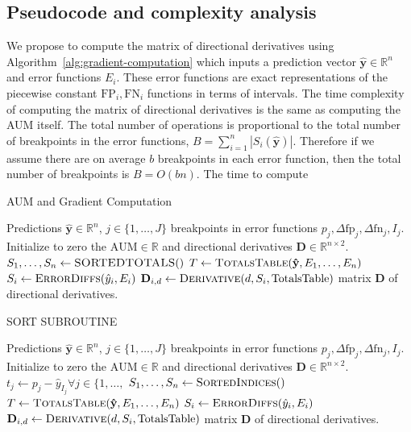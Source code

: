 \documentclass{article}
\begin{document}
\subsection{Pseudocode and complexity analysis}
We propose to compute the matrix of directional derivatives using Algorithm~\ref{alg:gradient-computation} which inputs a prediction vector $\mathbf {\hat y}\in\mathbb R^n$ and error functions $E_i$.
These error functions are exact representations of the piecewise constant $\text{FP}_i, \text{FN}_i$ functions in terms of intervals.
The time complexity of computing the matrix of directional derivatives 
is the same as computing the AUM itself.
The total number of operations is proportional to the total number of breakpoints in the error functions, $B = \sum_{i=1}^n |S_i(\mathbf{\hat{y}})|$.
Therefore if we assume there are on average $b$ breakpoints in each error function, then the total number of breakpoints is $B=O(bn)$.
The time to compute


\begin{algorithm}[tb]
  \caption{AUM and Gradient Computation}
  \label{alg:gradient-computation}
\begin{algorithmic}[1]
  Predictions $\mathbf{\hat y}\in\mathbb R^n$, 
  $j\in\{1,\dots,J\}$ breakpoints in error functions  $p_j,\Delta\text{fp}_j,\Delta\text{fn}_j,I_j$.
  \STATE Initialize to zero the $\text{AUM}\in\mathbb R$ and directional derivatives $\mathbf D\in\mathbb R^{n\times 2}$.
  \STATE  $S_1,\dots,S_n\gets \textsc{SORTEDTOTALS}()$
  \STATE  $T\gets \textsc{TotalsTable}(\mathbf{\hat y}, E_1, \dots, E_n)$
  \STATE $S_i \gets \textsc{ErrorDiffs}(\hat y_i, E_i)$
  \STATE $\mathbf D_{i,d}\gets \textsc{Derivative}(d, S_i, \text{TotalsTable})$
  \ENDFOR
  \ENDFOR
   matrix $\mathbf D$ of directional derivatives.
\end{algorithmic}
\end{algorithm}

\begin{algorithm}[tb]
  \caption{SORT SUBROUTINE}
  \label{alg:sort-subroutine}
\begin{algorithmic}[1]
  Predictions $\mathbf{\hat y}\in\mathbb R^n$, 
  $j\in\{1,\dots,J\}$ breakpoints in error functions  $p_j,\Delta\text{fp}_j,\Delta\text{fn}_j,I_j$.
  \STATE Initialize to zero the $\text{AUM}\in\mathbb R$ and directional derivatives $\mathbf D\in\mathbb R^{n\times 2}$.
  \STATE  $t_j\gets p_j - \hat y_{I_j} \forall j\in\{1,\dots,$
  \STATE  $S_1,\dots,S_n\gets \textsc{SortedIndices}()$
  \STATE  $T\gets \textsc{TotalsTable}(\mathbf{\hat y}, E_1, \dots, E_n)$
  \STATE $S_i \gets \textsc{ErrorDiffs}(\hat y_i, E_i)$
  \STATE $\mathbf D_{i,d}\gets \textsc{Derivative}(d, S_i, \text{TotalsTable})$
  \ENDFOR
  \ENDFOR
   matrix $\mathbf D$ of directional derivatives.
\end{algorithmic}
\end{algorithm}
\end{document}

